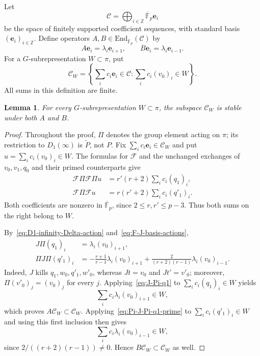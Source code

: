 \documentclass[10pt]{article}
\theoremstyle{plain}
\newtheorem{lemma}[theorem]{Lemma}
\theoremstyle{definition}
\theoremstyle{remark}
\newcommand{\Fpbar}{\overline{\mathbb{F}}_p}
\newcommand{\End}{\mathrm{End}}
\begin{document}
Let
\[
\mathcal C=\bigoplus_{i\in\mathbb{Z}}\Fpbar\mathbf e_i
\]
be the space of finitely supported coefficient sequences, with standard basis $(\mathbf e_i)_{i\in\mathbb{Z}}$. Define operators $A,B\in\End_{\Fpbar}(\mathcal C)$ by
\begin{equation}\label{eq:coefficient-shifts}
A\mathbf e_i=\lambda_i\mathbf e_{i+1},\qquad
B\mathbf e_i=\lambda_i\mathbf e_{i-1}.
\end{equation}
For a $G$-subrepresentation $W\subset\pi$, put
\begin{equation}\label{eq:coefficient-space-W}
\mathcal C_W=\left\{\sum_i c_i\mathbf e_i\in\mathcal C:
\sum_i c_i(v_0)_i\in W\right\}.
\end{equation}
All sums in this definition are finite.

\begin{lemma}\label{lem:coefficient-shift-stability}
For every $G$-subrepresentation $W\subset\pi$, the subspace $\mathcal C_W$ is stable under both $A$ and $B$.
\end{lemma}

\begin{proof}
Throughout the proof, $\Pi$ denotes the group element acting on $\pi$; its restriction to $D_1(\infty)$ is $\widetilde P$, not $P$. Fix $\sum_i c_i\mathbf e_i\in\mathcal C_W$ and put $u=\sum_i c_i(v_0)_i\in W$. The formulas for $\mathcal F$ and the unchanged exchanges of $v_0,v_1,q_0$ and their primed counterparts give
\begin{align*}
\mathcal F\Pi\mathcal F\Pi u
&=r'(r+2)\sum_i c_i(q_1)_i,\\
\mathcal F\Pi\mathcal F u
&=r(r'+2)\sum_i c_i(q'_1)_i.
\end{align*}
Both coefficients are nonzero in $\Fpbar$, since $2\leq r,r'\leq p-3$. Thus both sums on the right belong to $W$.

By~\eqref{eq:D1-infinity-Delta-action} and~\eqref{eq:F-J-basis-actions},
\begin{align}
J\Pi(q_1)_i
&=\lambda_i(v_0)_{i+1},\label{eq:J-Pi-q1}\\
\Pi J\Pi(q'_1)_i
&=-\frac{r+1}{r-1}\lambda_i(v_0)_{i+1}
+\frac{2}{(r+2)(r-1)}\lambda_i(v_0)_{i-1}.
\label{eq:Pi-J-Pi-q1-prime}
\end{align}
Indeed, $J$ kills $q_1,w_0,q'_1,w'_0$, whereas $Jt=v_0$ and $Jt'=v'_0$; moreover, $\Pi(v'_0)_j=(v_0)_j$ for every $j$. Applying~\eqref{eq:J-Pi-q1} to $\sum_i c_i(q_1)_i\in W$ yields
\[
\sum_i c_i\lambda_i(v_0)_{i+1}\in W,
\]
which proves $A\mathcal C_W\subset\mathcal C_W$. Applying~\eqref{eq:Pi-J-Pi-q1-prime} to $\sum_i c_i(q'_1)_i\in W$ and using this first inclusion then gives
\[
\sum_i c_i\lambda_i(v_0)_{i-1}\in W,
\]
since $2/((r+2)(r-1))\ne0$. Hence $B\mathcal C_W\subset\mathcal C_W$ as well.
\end{proof}
\end{document}
